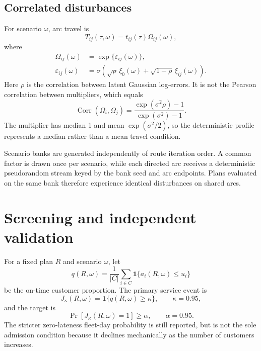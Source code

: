 \documentclass[11pt,a4paper]{article}
\begin{document}
\subsection{Correlated disturbances}

For scenario $\omega$, arc travel is
\begin{equation}
 T_{ij}(\tau,\omega)=t_{ij}(\tau)\Omega_{ij}(\omega),
\end{equation}
where
\begin{align}
 \Omega_{ij}(\omega)&=\exp\{\varepsilon_{ij}(\omega)\},\\
 \varepsilon_{ij}(\omega)&=\sigma\left(
 \sqrt{\rho}\,\xi_0(\omega)+\sqrt{1-\rho}\,\xi_{ij}(\omega)\right).
                                                               \label{eq:noise}
\end{align}
Here $\rho$ is the correlation between latent Gaussian log-errors. It is not
the Pearson correlation between multipliers, which equals
\begin{equation}
 \operatorname{Corr}(\Omega_i,\Omega_j)
 =\frac{\exp(\sigma^2\rho)-1}{\exp(\sigma^2)-1}.
\end{equation}
The multiplier has median 1 and mean $\exp(\sigma^2/2)$, so the deterministic
profile represents a median rather than a mean travel condition.

Scenario banks are generated independently of route iteration order. A common
factor is drawn once per scenario, while each directed arc receives a
deterministic pseudorandom stream keyed by the bank seed and arc endpoints.
Plans evaluated on the same bank therefore experience identical disturbances
on shared arcs.

\section{Screening and independent validation}

For a fixed plan $R$ and scenario $\omega$, let
\begin{equation}
 q(R,\omega)=\frac{1}{|C|}\sum_{i\in C}
 \mathbf{1}\{a_i(R,\omega)\leq u_i\}
\end{equation}
be the on-time customer proportion. The primary service event is
\begin{equation}
 J_{\kappa}(R,\omega)=\mathbf{1}\{q(R,\omega)\geq\kappa\},
 \qquad \kappa=0.95,                                        \label{eq:event}
\end{equation}
and the target is
\begin{equation}
 \Pr[J_{\kappa}(R,\omega)=1]\geq\alpha,
 \qquad \alpha=0.95.                                       \label{eq:chance}
\end{equation}
The stricter zero-lateness fleet-day probability is still reported, but is not
the sole admission condition because it declines mechanically as the number of
customers increases.
\end{document}
